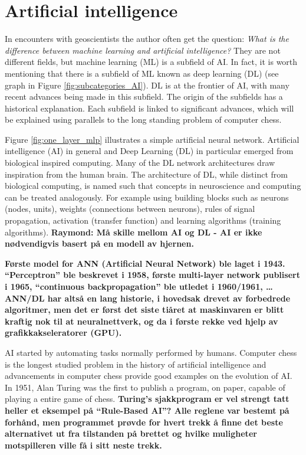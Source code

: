 \documentclass{article}
\begin{document}
\section{Artificial intelligence}

In encounters with geoscientists the author often get the question: \textit{What is the difference between machine learning and artificial intelligence?} They are not different fields, but machine learning (ML) is a subfield of AI. In fact, it is worth mentioning that there is a subfield of ML known as deep learning (DL) (see graph in Figure \ref{fig:subcategories_AI}). DL is at the frontier of AI, with many recent advances being made in this subfield. %
The origin of the subfields has a historical explanation. Each subfield is linked to significant advances, which will be explained using parallels to the long standing problem of computer chess. 

Figure \ref{fig:one_layer_mlp} illustrates a simple artificial neural network. Artificial intelligence (AI) in general and Deep Learning (DL) in particular emerged from biological inspired computing. Many of the DL network architectures draw inspiration from the human brain. The architecture of DL, while distinct from biological computing, is named such that concepts in neuroscience and computing can be treated analogously. For example using building blocks such as neurons (nodes, units), weights (connections between neurons), rules of signal propagation, activation (transfer function) and learning algorithms (training algorithms). \textbf{Raymond: Må skille mellom AI og DL - AI er ikke nødvendigvis basert på en modell av hjernen.}

\textbf{Første model for ANN (Artificial Neural Network) ble laget i 1943. ``Perceptron'' ble beskrevet i 1958, første multi-layer network publisert i 1965, ``continuous backpropagation'' ble utledet i 1960/1961, \ldots ANN/DL har altså en lang historie, i hovedsak drevet av forbedrede algoritmer, men det er først det siste tiåret at maskinvaren er blitt kraftig nok til at neuralnettverk, og da i første rekke ved hjelp av grafikkakseleratorer (GPU).} 

AI started by automating tasks normally performed by humans. Computer chess is the longest studied problem in the history of artificial intelligence and advancements in computer chess provide good examples on the evolution of AI. In 1951, Alan Turing was the first to publish a program, on paper, capable of playing a entire game of chess. \textbf{Turing's sjakkprogram er vel strengt tatt heller et eksempel på ``Rule-Based AI''? Alle reglene var bestemt på forhånd, men programmet prøvde for hvert trekk å finne det beste alternativet ut fra tilstanden på brettet og hvilke muligheter motspilleren ville få i sitt neste trekk.}
\end{document}

